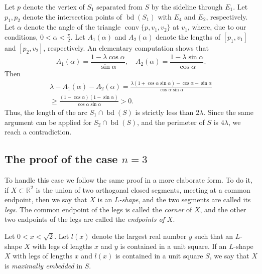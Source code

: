 \documentclass[twoside]{amsart}
\renewcommand{\Re}{\mathbb{R}}
\DeclareMathOperator{\conv}{conv}
\DeclareMathOperator{\bd}{bd}
\begin{document}
Let $p$ denote the vertex of $S_1$ separated from $S$ by the sideline through $E_1$. Let $p_1,p_2$ denote the intersection points of $\bd(S_1)$ with $E_4$ and $E_2$, respectively. Let $\alpha$ denote the angle of the triangle $\conv \{ p,v_1,v_2 \}$ at $v_1$, where, due to our conditions, $0 < \alpha < \frac{\pi}{2}$. Let $A_1(\alpha)$ and $A_2(\alpha)$ denote the lengths of $[p_1,v_1]$ and $[p_2,v_2]$, respectively. An elementary computation shows that
\begin{equation}\label{eq:A1A2}
A_1(\alpha) = \frac{1-\lambda \cos \alpha}{\sin \alpha}, \quad A_2(\alpha) = \frac{1-\lambda \sin \alpha}{\cos \alpha}.
\end{equation}
Then
\begin{multline}\label{eq:mainforn2}
\lambda-A_{1}(\alpha)-A_{2}(\alpha) =\frac{\lambda(1+\cos\alpha\sin\alpha)-\cos\alpha-\sin\alpha}{\cos
\alpha\sin\alpha}\\
\geq \frac{\left(  1-\cos\alpha\right)  \left(  1-\sin\alpha\right)  }%
{\cos\alpha\sin\alpha}>0 .
\end{multline}
Thus, the length of the arc $S_1 \cap \bd(S)$ is strictly less than $2\lambda$. Since the same argument can be applied for $S_2 \cap \bd(S)$, and the perimeter of $S$ is $4\lambda$, we reach a contradiction.

\subsection{The proof of the case $n=3$}\label{subsec:nis3}

To handle this case we follow the same proof in a more elaborate form.
To do it, if $X \subset \Re^2$ is the union of two orthogonal closed segments, meeting at a common endpoint, then we say that $X$ is an \emph{$L$-shape}, and the two segments are called its \emph{legs}. The common endpoint of the legs is called the \emph{corner} of $X$, and the other two endpoints of the legs are called the \emph{endpoints of $X$}.

Let $0 < x < \sqrt{2}$. Let $l(x)$ denote the largest real number $y$ such that an $L$-shape $X$ with legs of lengths $x$ and $y$ is contained in a
unit square. If an $L$-shape $X$ with legs of lengths $x$ and $l(x)$ is contained in a unit square $S$, we say that $X$ is \emph{maximally embedded} in $S$.
\end{document}
